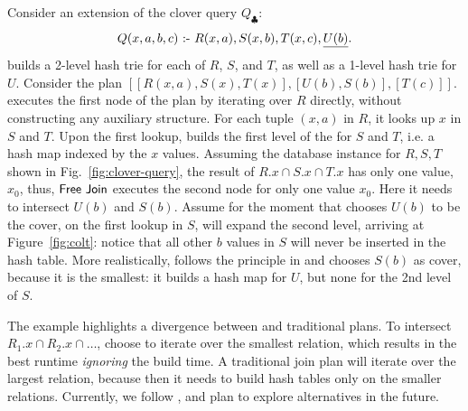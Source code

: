 \begin{example}\label{ex:colt-clover}
Consider an extension of the clover query $Q_\clubsuit$:
\begin{align*}
  Q(x, a, b, c) \text{ :- } R(x,a), S(x,b), T(x, c), \underline{U(b)}.
\end{align*}
%
\GJ builds a 2-level hash trie for each of $R$, $S$, and $T$, as well
as a 1-level hash trie for $U$.  Consider the \FJ plan
$[[R(x,a),S(x),T(x)],[U(b),S(b)],[T(c)]]$.  \FJ executes the first
node of the plan by iterating over $R$ directly, without constructing
any auxiliary structure. For each tuple $(x, a)$ in $R$, it looks up
$x$ in $S$ and $T$.  Upon the first lookup, \COLT builds the first
level of the \GHT for $S$ and $T$, i.e. a hash map indexed by the $x$
values.  Assuming the database instance for $R,S,T$ shown in
Fig.~\ref{fig:clover-query}, the result of $R.x \cap S.x \cap T.x$ has
only one value, $x_0$, thus, $\textsf{Free Join}$ executes the second node for only
one value $x_0$.  Here it needs to intersect $U(b)$ and $S(b)$.
Assume for the moment that \FJ chooses $U(b)$ to be the cover, on the
first lookup in $S$, \COLT will expand the second level, arriving at
Figure~\ref{fig:colt}: notice that all other $b$ values in $S$ will
never be inserted in the hash table.  More realistically, \FJ follows
the principle in \GJ and chooses $S(b)$ as cover, because it is the
smallest: it builds a hash map for $U$, but none for the 2nd level of
$S$.
\end{example}

The example highlights a divergence between \GJ and traditional plans.
To intersect $R_1.x \cap R_2.x \cap \ldots$, \GJ choose to iterate
over the smallest relation, which results in the best runtime {\em
  ignoring} the build time.  A traditional join plan will iterate over
the largest relation, because then it needs to build hash tables only
on the smaller relations.  Currently, we follow \GJ, and plan to
explore alternatives in the future.




